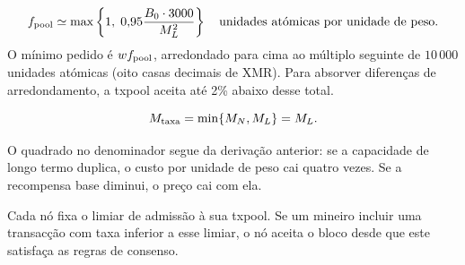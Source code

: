 \begin{align*}
f_{\rm pool}\simeq
\max\left\{1,\;0{,}95\frac{B_0\cdot3000}{M_L^2}\right\}
\quad\text{unidades atómicas por unidade de peso}.
\end{align*}
%
O mínimo pedido é $w f_{\rm pool}$, arredondado para cima ao múltiplo seguinte
de $10\,000$ unidades atómicas (oito casas decimais de XMR). Para absorver
diferenças de arredondamento, a txpool aceita até 2\% abaixo desse total.

\[M_{\rm taxa}=\min\{M_N,M_L\}=M_L.\]



O quadrado no denominador segue da derivação anterior: se a capacidade de
longo termo duplica, o custo por unidade de peso cai quatro vezes. Se a
recompensa base diminui, o preço cai com ela.

%
Cada nó fixa o limiar de admissão à sua txpool. Se um mineiro incluir uma
transacção com taxa inferior a esse limiar, o nó aceita o bloco desde que
este satisfaça as regras de consenso.

